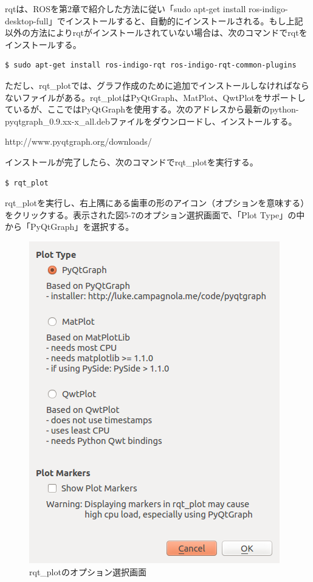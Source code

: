 rqtは、ROSを第2章で紹介した方法に従い「sudo apt-get install ros-indigo-desktop-full」でインストールすると、自動的にインストールされる。もし上記以外の方法によりrqtがインストールされていない場合は、次のコマンドでrqtをインストールする。

\vspace{\baselineskip}
\begin{lstlisting}[language=ROS]
$ sudo apt-get install ros-indigo-rqt ros-indigo-rqt-common-plugins
\end{lstlisting}

ただし、rqt\_plotでは、グラフ作成のために追加でインストールしなければならないファイルがある。rqt\_plotはPyQtGraph、MatPlot、QwtPlotをサポートしているが、ここではPyQtGraphを使用する。次のアドレスから最新のpython-pyqtgraph\_0.9.xx-x\_all.debファイルをダウンロードし、インストールする。

http://www.pyqtgraph.org/downloads/

インストールが完了したら、次のコマンドでrqt\_plotを実行する。

\vspace{\baselineskip}
\begin{lstlisting}[language=ROS]
$ rqt_plot
\end{lstlisting}

rqt\_plotを実行し、右上隅にある歯車の形のアイコン（オプションを意味する）をクリックする。表示された図5-7のオプション選択画面で、「Plot Type」の中から「PyQtGraph」を選択する。

\begin{figure}[h]
  \centering
  \includegraphics[width=\columnwidth]{pictures/chapter5/pic_05_07.png}
  \caption{rqt\_plotのオプション選択画面}
\end{figure}

